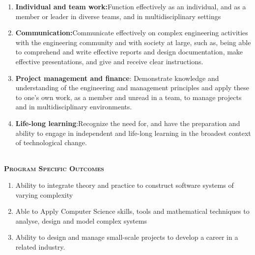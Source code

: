\documentclass[10pt,a4paper]{report}
\begin{document}
\begin{center}
\begin{center}
\begin{enumerate}
	\item \textbf{\large Individual and team work:}\large Function effectively as an individual, and as a member or leader in diverse teams, and in multidisciplinary settings ~
	\item \textbf{\large Communication:}\large Communicate effectively on complex engineering activities with the engineering community and with society at large, such as, being able to comprehend and write effective reports and design documentation, make effective presentations, and give and receive clear instructions. ~
	\item \textbf{\large Project management and finance}\large: Demonstrate knowledge and understanding
	of the engineering and management principles and apply these to one's own work,
	as a member and unread in a team, to manage projects and in multidisciplinary
	environments.~
	\item \textbf{\large Life-long learning}\large :Recognize the need for, and have the preparation and ability to engage in independent and life-long learning in the broadest context of technological change.~

		\end{enumerate}
	
	\thispagestyle{empty}

	\end{center}

	\begin{center}
		
		\textsc{\large\bfseries }\\
		[0.50cm]
		\textsc{\large\bfseries\upshape Program Specific Outcomes}\\
		[0.70cm]
		\justify
		\begin{enumerate}
			\item\large Ability to integrate theory and practice to construct software systems of varying complexity
			\item\large Able to Apply Computer Science skills, tools and mathematical techniques to analyse, design and model complex systems
			\item\large Ability to design and manage small-scale projects to develop a career in a related industry.

			\end{enumerate}

		\end{center}

	\end{center}
\end{document}
